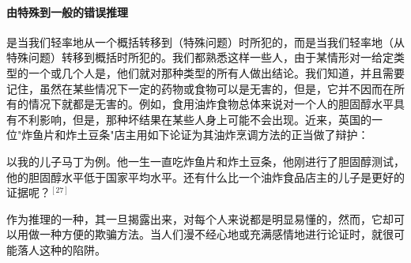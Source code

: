 \paragraph{由特殊到一般的错误推理}
是当我们轻率地从一个概括转移到（特殊问题）时所犯的，而是当我们轻率地（从特殊问题）转移到概括时所犯的。我们都熟悉这样一些人，由于某情形对一给定类型的一个或几个人是，他们就对那种类型的所有人做出结论。我们知道，并且需要记住，虽然在某些情况下一定的药物或食物可以是无害的，但是，它并不因而在所有的情况下就都是无害的。例如，食用油炸食物总体来说对一个人的胆固醇水平具有不利影响，但是，那种坏结果在某些人身上可能不会出现。近来，英国的一位"炸鱼片和炸土豆条"店主用如下论证为其油炸烹调方法的正当做了辩护：

\begin{logicbox}[title=逆偶然谬误的例子]
以我的儿子马丁为例。他一生一直吃炸鱼片和炸土豆条，他刚进行了胆固醇测试，他的胆固醇水平低于国家平均水平。还有什么比一个油炸食品店主的儿子是更好的证据呢？${ }^{[27]}$
\end{logicbox}

作为推理的一种，其一旦揭露出来，对每个人来说都是明显易懂的，然而，它却可以用做一种方便的欺骗方法。当人们漫不经心地或充满感情地进行论证时，就很可能落人这种的陷阱。

